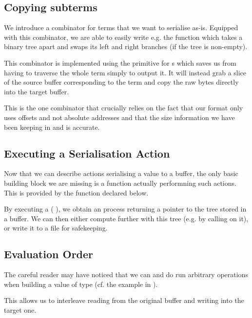 \subsection{Copying subterms}

We introduce a  combinator for terms that we want to
serialise as-is.
%
Equipped with this combinator, we are able to easily write e.g.
the  function which takes a binary tree apart
and swaps its left and right branches (if the tree is non-empty).



This combinator is implemented using the  primitive
for s which saves us from having to traverse the whole term
simply to output it.
%
It will instead grab a slice of the source buffer corresponding to the term
and copy the raw bytes directly into the target buffer.


This is the one combinator that crucially relies on the fact that our format
only uses offsets and not absolute addresses
and that the size information we have been keeping in  and
 is accurate.

\subsection{Executing a Serialisation Action}

Now that we can describe actions serialising a value to a buffer,
the only basic building block we are missing is a function actually
performning such actions.
%
This is provided by the  function
declared below.


By executing a (  ), we
obtain an  process returning a pointer to the tree 
stored in a buffer.
%
We can then either compute further with this tree (e.g. by calling
 on it), or write it to a file for safekeeping.

\subsection{Evaluation Order}

The careful reader may have noticed that we can and do run arbitrary 
operations when building a value of type 
(cf. the  example in ).


This allows us to interleave reading from the original buffer and
writing into the target one.
